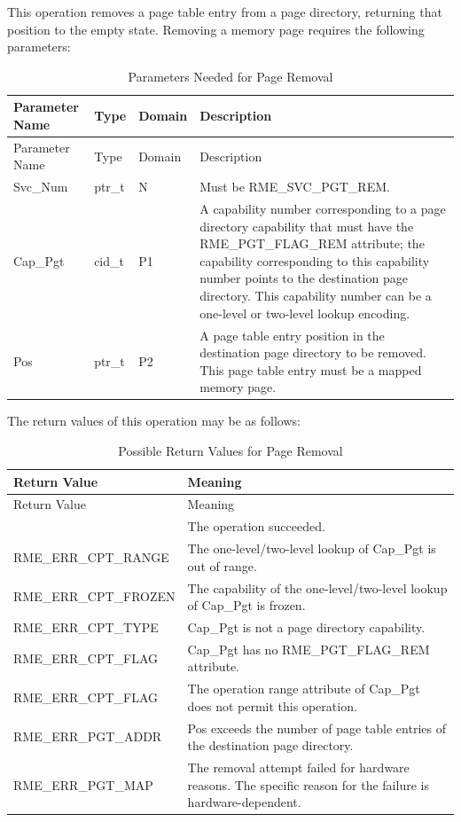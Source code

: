 This operation removes a page table entry from a page directory, returning that position to the empty state. Removing a memory page requires the following parameters:

\begin{xltabular}{\textwidth}{@{}>{\hsize\raggedright\arraybackslash}X>{\hsize\raggedright\arraybackslash}X>{\hsize\raggedright\arraybackslash}X>{\hsize\raggedright\arraybackslash}X@{}}
\caption{Parameters Needed for Page Removal}\label{tab:3-16-remove-memory-page-parameters}\\
\toprule
Parameter Name & Type & Domain & Description\tabularnewline
\endfirsthead
\toprule
Parameter Name & Type & Domain & Description\tabularnewline
\midrule
\endhead
\bottomrule
\endlastfoot
Svc\_Num & ptr\_t & N & Must be RME\_SVC\_PGT\_REM.\tabularnewline
Cap\_Pgt & cid\_t & P1 &
A capability number corresponding to a page directory capability that must have the RME\_PGT\_FLAG\_REM attribute; the capability corresponding to this capability number points to the destination page directory. This capability number can be a one-level or two-level lookup encoding.\tabularnewline
Pos & ptr\_t & P2 &
A page table entry position in the destination page directory to be removed. This page table entry must be a mapped memory page.\tabularnewline
\end{xltabular}
\nopagebreak[4]

The return values of this operation may be as follows:

\begin{xltabular}{\textwidth}{@{}>{\hsize\raggedright\arraybackslash}X>{\hsize\raggedright\arraybackslash}X@{}}
\caption{Possible Return Values for Page Removal}\label{tab:3-17-remove-memory-page-return-values}\\
\toprule
Return Value & Meaning\tabularnewline
\endfirsthead
\toprule
Return Value & Meaning\tabularnewline
\midrule
\endhead
\bottomrule
{} & The operation succeeded.\tabularnewline
    RME\_ERR\_CPT\_RANGE & The one-level/two-level lookup of Cap\_Pgt is out of range.\tabularnewline
    RME\_ERR\_CPT\_FROZEN & The capability of the one-level/two-level lookup of Cap\_Pgt is frozen.\tabularnewline
    RME\_ERR\_CPT\_TYPE & Cap\_Pgt is not a page directory capability.\tabularnewline
    RME\_ERR\_CPT\_FLAG & Cap\_Pgt has no RME\_PGT\_FLAG\_REM attribute.\tabularnewline
    RME\_ERR\_CPT\_FLAG & The operation range attribute of Cap\_Pgt does not permit this operation.\tabularnewline
    RME\_ERR\_PGT\_ADDR & Pos exceeds the number of page table entries of the destination page directory.\tabularnewline
    RME\_ERR\_PGT\_MAP & The removal attempt failed for hardware reasons. The specific reason for the failure is hardware-dependent.\tabularnewline
\end{xltabular}
\nopagebreak[4]

